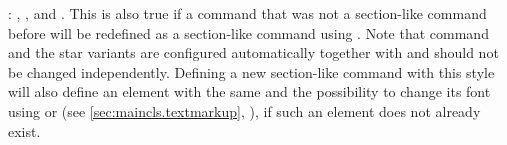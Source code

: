 \begin{labeling}{:}
  , , and . This is also
  true if a command that was not a section-like command before will be
  redefined as a section-like command using
  . Note that command
   and the star variants are configured automatically together
  with  and should not be changed
  independently. Defining a new section-like command with this style will also
  define an element with the same  and the possibility to change
  its font using  or
   (see \autoref{sec:maincls.textmarkup},
  ), if such an element does not already
  exist.
\end{labeling}

